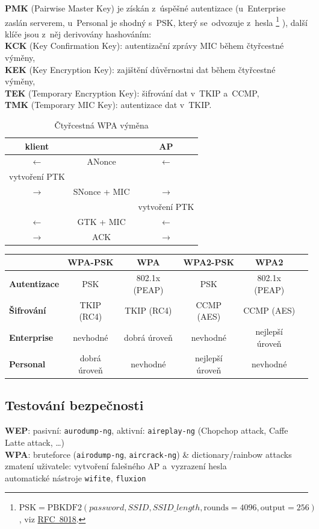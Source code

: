 \vspace*{1em}\noindent
\textbf{PMK} (Pairwise Master Key) je získán z~úspěšné autentizace (u~Enterprise zaslán serverem, u~Personal je shodný s~PSK, který se~odvozuje z~hesla%
\footnote{$\mathrm{PSK} = \mathrm{PBKDF2}(password, SSID, SSID\_length, \mathrm{rounds}=4096, \mathrm{output}=256)$, viz \href{https://datatracker.ietf.org/doc/html/rfc8018}{RFC~8018}.}%
), další klíče jsou z~něj derivovány hashováním: \\
\textbf{KCK} (Key Confirmation Key): autentizační zprávy MIC během čtyřcestné výměny, \\
\textbf{KEK} (Key Encryption Key): zajištění důvěrnostni dat během čtyřcestné výměny, \\
\textbf{TEK} (Temporary Encryption Key): šifrování dat v~TKIP a~CCMP, \\
\textbf{TMK} (Temporary MIC Key): autentizace dat v~TKIP.

\begin{table}[ht]
\centering
\begin{tabular}{ccc}
\textbf{klient} && \textbf{AP} \\
\hline
$\leftarrow$ & ANonce & $\leftarrow$ \\
vytvoření PTK && \\
$\rightarrow$ & SNonce + MIC & $\rightarrow$ \\
&& vytvoření PTK \\
$\leftarrow$ & GTK + MIC & $\leftarrow$ \\
$\rightarrow$ & ACK & $\rightarrow$ \\
\end{tabular}
\caption*{Čtyřcestná WPA výměna}
\end{table}

\begin{table}[ht]
\centering
\begin{tabular}{l|ccccc}
& \textbf{WPA-PSK} & \textbf{WPA} & \textbf{WPA2-PSK} & \textbf{WPA2} \\
\hline
\textbf{Autentizace} & PSK & 802.1x (PEAP) & PSK & 802.1x (PEAP) \\
\textbf{Šifrování} & TKIP (RC4) & TKIP (RC4) & CCMP (AES) & CCMP (AES) \\
\textbf{Enterprise} & nevhodné & dobrá úroveň & nevhodné & nejlepší úroveň \\
\textbf{Personal} & dobrá úroveň & nevhodné & nejlepší úroveň & nevhodné \\
\end{tabular}
\end{table}

\subsection{Testování bezpečnosti}

\textbf{WEP}: pasivní: \texttt{aurodump-ng}, aktivní: \texttt{aireplay-ng} (Chopchop attack, Caffe Latte attack, \dots) \\
\textbf{WPA}: bruteforce (\texttt{airodump-ng}, \texttt{aircrack-ng}) \& dictionary/rainbow attacks \\
zmatení uživatele: vytvoření falešného AP a~vyzrazení hesla \\
automatické nástroje \texttt{wifite}, \texttt{fluxion}
